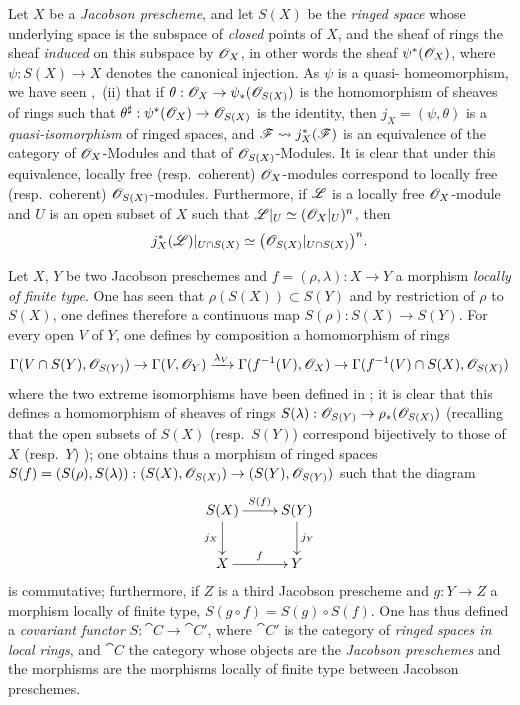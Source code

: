 \begin{env}[10.9.1]
\label{IV.10.9.1}
Let $X$ be a \emph{Jacobson prescheme}, and let $S(X)$ be the \emph{ringed space} whose underlying space is the subspace of \emph{closed} points of $X$, and the sheaf of rings the sheaf \emph{induced} on this subspace by $\mathscr{O}_X$, in other words the sheaf $\psi^*(\mathscr{O}_X)$, where $\psi:S(X)\to X$ denotes the canonical injection.
As $\psi$ is a quasi-%
homeomorphism, we have seen ,~(ii) that if $\theta:\mathscr{O}_X\to\psi_*(\mathscr{O}_{S(X)})$ is the homomorphism of sheaves of rings such that $\theta^\sharp:\psi^*(\mathscr{O}_X)\to\mathscr{O}_{S(X)}$ is the identity, then $j_X=(\psi,\theta)$ is a \emph{quasi-isomorphism} of ringed spaces, and $\mathscr{F}\leadsto j_X^*(\mathscr{F})$ is an equivalence of the category of $\mathscr{O}_X$-Modules and that of $\mathscr{O}_{S(X)}$-Modules.
It is clear that under this equivalence, locally free (resp.\ coherent) $\mathscr{O}_X$-modules correspond to locally free (resp.\ coherent) $\mathscr{O}_{S(X)}$-modules. Furthermore, if $\mathscr{L}$ is a locally free $\mathscr{O}_X$-module and $U$ is an open subset of $X$ such that $\mathscr{L}|_U\simeq(\mathscr{O}_X|_U)^n$, then
\[
  j_X^*(\mathscr{L})|_{U\cap S(X)}
  \simeq \bigl(\mathscr{O}_{S(X)}|_{U\cap S(X)}\bigr)^n.
\]
\end{env}

\begin{env}[10.9.2]
\label{IV.10.9.2}
Let $X$, $Y$ be two Jacobson preschemes and $f=(\rho,\lambda):X\to Y$ a morphism \emph{locally of finite type}.
One has seen  that $\rho(S(X))\subset S(Y)$ and by restriction of $\rho$ to $S(X)$, one defines therefore a continuous map $S(\rho):S(X)\to S(Y)$.
For every open $V$ of $Y$, one defines by composition a homomorphism of rings
\[
  \Gamma(V\cap S(Y),\mathscr{O}_{S(Y)})\to\Gamma(V,\mathscr{O}_Y)\xrightarrow{\lambda_V}\Gamma(f^{-1}(V),\mathscr{O}_X)\to\Gamma(f^{-1}(V)\cap S(X),\mathscr{O}_{S(X)})
\]
where the two extreme isomorphisms have been defined in ; it is clear that this defines a homomorphism of sheaves of rings $S(\lambda):\mathscr{O}_{S(Y)}\to\rho_*(\mathscr{O}_{S(X)})$ (recalling that the open subsets of $S(X)$ (resp.\ $S(Y)$) correspond bijectively to those of $X$ (resp.\ $Y$) ); one obtains thus a morphism of ringed spaces $S(f)=(S(\rho),S(\lambda)):(S(X),\mathscr{O}_{S(X)})\to(S(Y),\mathscr{O}_{S(Y)})$ such that the diagram
\[
  \xymatrix{
    S(X)\ar[r]^{S(f)}\ar[d]_{j_X} & S(Y)\ar[d]^{j_Y}\\
    X\ar[r]^{f} & Y
  }
\]
is commutative; furthermore, if $Z$ is a third Jacobson prescheme and $g:Y\to Z$ a morphism locally of finite type, $S(g\circ f)=S(g)\circ S(f)$.
One has thus defined a \emph{covariant functor} $S:\cat{C}\to\cat{C}'$, where $\cat{C}'$ is the category of \emph{ringed spaces in local rings}, and $\cat{C}$ the category whose objects are the \emph{Jacobson preschemes} and the morphisms are the morphisms locally of finite type between Jacobson preschemes.
\end{env}

